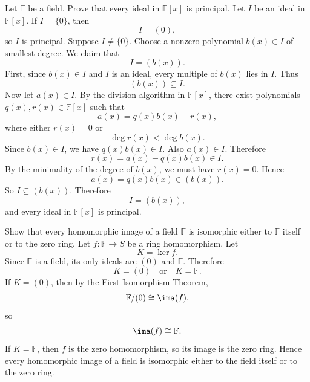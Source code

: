 \begin{problem}{
    Let $\mathbb{F}$ be a field.
    Prove that every ideal in $\mathbb{F}[x]$ is principal.
}
    Let $I$ be an ideal in $\mathbb{F}[x]$.
    If $I=\{0\}$, then
    \[
        I = (0),
    \]
    so $I$ is principal.
    Suppose $I\neq \{0\}$.
    Choose a nonzero polynomial $b(x)\in I$ of smallest degree.
    We claim that
    \[
        I = (b(x)).
    \]
    First, since $b(x)\in I$ and $I$ is an ideal, every multiple of $b(x)$ lies in $I$.
    Thus
    \[
        (b(x))\subseteq I.
    \]
    Now let $a(x)\in I$.
    By the division algorithm in $\mathbb{F}[x]$, there exist polynomials $q(x),r(x)\in\mathbb{F}[x]$ such that
    \[
        a(x) = q(x)b(x) + r(x),
    \]
    where either $r(x)=0$ or
    \[
        \deg r(x) < \deg b(x).
    \]
    Since $b(x)\in I$, we have $q(x)b(x)\in I$.
    Also $a(x)\in I$.
    Therefore
    \[
        r(x) = a(x)-q(x)b(x)\in I.
    \]
    By the minimality of the degree of $b(x)$, we must have $r(x)=0$.
    Hence
    \[
        a(x) = q(x)b(x)\in (b(x)).
    \]
    So $I\subseteq (b(x))$.
    Therefore
    \[
        I = (b(x)),
    \]
    and every ideal in $\mathbb{F}[x]$ is principal.
\end{problem}
\begin{problem}{
    Show that every homomorphic image of a field $\mathbb{F}$ is isomorphic either to $\mathbb{F}$ itself or to the zero ring.
}
    Let $f:\mathbb{F}\to S$ be a ring homomorphism.
    Let
    \[
        K = \ker f.
    \]
    Since $\mathbb{F}$ is a field, its only ideals are $(0)$ and $\mathbb{F}$.
    Therefore
    \[
        K = (0)
        \quad\text{or}\quad
        K = \mathbb{F}.
    \]
    If $K=(0)$, then by the First Isomorphism Theorem,
    \[
        \mathbb{F}/(0)\cong \ima(f),
    \]
    so
    \[
        \ima(f)\cong \mathbb{F}.
    \]
    If $K=\mathbb{F}$, then $f$ is the zero homomorphism, so its image is the zero ring.
    Hence every homomorphic image of a field is isomorphic either to the field itself or to the zero ring.
\end{problem}
